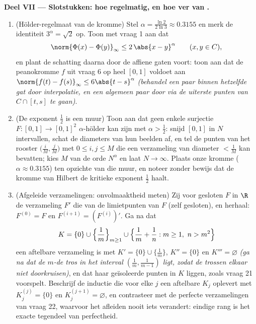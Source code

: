 \begin{problem}
\medskip
\noindent\textbf{Deel VII --- Slotstukken: hoe regelmatig, en hoe
ver van .}
\begin{enumerate}[resume]
  \item (Hölder-regelmaat van de kromme) Stel $\alpha = \frac{\ln
        2}{2\ln 3} \approx 0.3155$ en merk de identiteit $3^\alpha
        = \sqrt2$ op. Toon met vraag 1 aan dat
        \[
        \norm{\Phi(x) - \Phi(y)}_\infty \leq 2\,\abs{x -
        y}^\alpha \qquad (x, y \in C),
        \]
        en plant de schatting daarna door de affiene gaten voort:
        toon aan dat de peanokromme $f$ uit vraag 6 op heel
        $[0,1]$ voldoet aan $\norm{f(t) - f(s)}_\infty \leq
        6\abs{t - s}^\alpha$ \emph{(behandel een paar binnen
        hetzelfde gat door interpolatie, en een algemeen paar door
        via de uiterste punten van $C \cap [t, s]$ te gaan)}.
  \item (De exponent $\frac12$ is een muur) Toon aan dat geen
        enkele surjectie $F \colon [0,1] \to [0,1]^2$
        $\alpha$-hölder kan zijn met $\alpha > \frac12$: snijd
        $[0,1]$ in $N$ intervallen, schat de diameters van hun
        beelden af, en tel de punten van het rooster $\bigl(\frac
        iM, \frac jM\bigr)$ met $0 \leq i, j \leq M$ die een
        verzameling van diameter $< \frac1M$ kan bevatten; kies
        $M$ van de orde $N^\alpha$ en laat $N \to \infty$. Plaats
        onze kromme ($\alpha \approx 0.3155$) ten opzichte van die
        muur, en noteer zonder bewijs dat de kromme van Hilbert de
        kritieke exponent $\frac12$ haalt.
  \item (Afgeleide verzamelingen: onvolmaaktheid meten) Zij voor
        gesloten $F$ in $\R$ de verzameling $F'$ die van de
        limietpunten van $F$ (zelf gesloten), en herhaal:
        $F^{(0)} = F$ en $F^{(i+1)} = (F^{(i)})'$. Ga na dat
        \[
        K = \{0\} \cup \Bigl\{\frac1m\Bigr\}_{m \geq 1} \cup
        \Bigl\{\frac1m + \frac1n : m \geq 1,\ n > m^2\Bigr\}
        \]
        een aftelbare  verzameling is met $K' = \{0\} \cup
        \{\frac1m\}$, $K'' = \{0\}$ en $K''' = \varnothing$
        \emph{(ga na dat de $m$-de tros in het interval
        $(\frac1m, \frac1{m-1})$ ligt, zodat de trossen elkaar
        niet doorkruisen)}, en dat haar geïsoleerde punten 
        in $K$ liggen, zoals vraag 21 voorspelt. Beschrijf de
        inductie die voor elke $j$ een aftelbare  $K_j$
        oplevert met $K_j^{(j)} = \{0\}$ en $K_j^{(j+1)} =
        \varnothing$, en contrasteer met de perfecte
        verzamelingen van vraag 22, waarvoor het afleiden nooit
        iets verandert: eindige rang is het exacte tegendeel van
        perfectheid.
\end{enumerate}
\end{problem}
